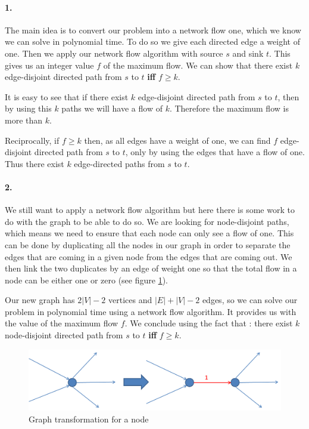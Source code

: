 \paragraph{1.}
The main idea is to convert our problem into a network flow one, which we know we can solve in polynomial time.
To do so we give each directed edge a weight of one. Then we apply our network flow algorithm with source $s$ and sink $t$. This gives us an integer value $f$ of the maximum flow. We can show that there exist $k$ edge-disjoint directed path from $s$ to $t$ \textbf{iff} $f \geqslant k$.

It is easy to see that if there exist $k$ edge-disjoint directed path from $s$ to $t$, then by using this $k$ paths we will have a flow of $k$. Therefore the maximum flow is more than $k$.

Reciprocally, if $f \geqslant k$ then, as all edges have a weight of one, we can find $f$ edge-disjoint directed path from $s$ to $t$, only by using the edges that have a flow of one. Thus there exist $k$ edge-directed paths from $s$ to $t$.

\paragraph{2.}
We still want to apply a network flow algorithm but here there is some work to do with the graph to be able to do so. We are looking for node-disjoint paths, which means we need to ensure that each node can only see a flow of one. This can be done by duplicating all the nodes in our graph in order to separate the edges that are coming in a given node from the edges that are coming out. We then link the two duplicates by an edge of weight one so that the total flow in a node can be either one or zero (see figure \ref{fig2}).

Our new graph has $2|V|-2$ vertices and $|E|+|V|-2$ edges, so we can solve our problem in polynomial time using a network flow algorithm. It provides us with the value of the maximum flow $f$. We conclude using the fact that : there exist $k$ node-disjoint directed path from $s$ to $t$ \textbf{iff} $f \geqslant k$.

\begin{figure}[H]
\centering
\includegraphics[width=14cm]{fig2.png}
\caption{Graph transformation for a node}
\label{fig2}
\end{figure}


